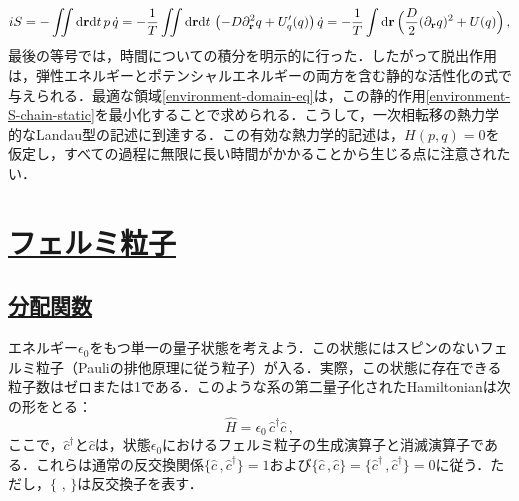 \documentclass[a4paper,11pt]{ltjsarticle}
\newcommand{\sectionlink}[1]{\section[#1]{\hyperlink{toc}{#1}}}
\newcommand{\subsectionlink}[1]{\subsection[#1]{\hyperlink{toc}{#1}}}
\def\d{\mathrm{d}}
\begin{document}
\begin{equation}\label{environment-S-chain-static}
iS=-\iint\d\mathbf{r}\d t\,p\, \dot q
=-{1\over T} \iint\d\mathbf{r}\d t\,
\left(-D \partial^2_\mathbf{r} q + U'_q(q)\right) \dot q
=-{1\over T}\int\d\mathbf{r}\,\Big({D\over 2} (\partial_\mathbf{r}
q)^2 + U(q)\Big)\, ,
\end{equation}最後の等号では，時間についての積分を明示的に行った．したがって脱出作用は，弾性エネルギーとポテンシャルエネルギーの両方を含む静的な活性化の式で与えられる．最適な領域\eqref{environment-domain-eq}は，この静的作用\eqref{environment-S-chain-static}を最小化することで求められる．こうして，一次相転移の熱力学的なLandau型の記述に到達する．この有効な熱力学的記述は，$H(p,q)=0$を仮定し，すべての過程に無限に長い時間がかかることから生じる点に注意されたい．





\sectionlink{フェルミ粒子}\label{sec_fermion}
\subsectionlink{分配関数}\label{sec_fermion-1}



エネルギー$\epsilon_0$をもつ単一の量子状態を考えよう．この状態にはスピンのないフェルミ粒子（Pauliの排他原理に従う粒子）が入る．実際，この状態に存在できる粒子数はゼロまたは1である．このような系の第二量子化されたHamiltonianは次の形をとる：
\begin{equation}\label{fermion-H}
\hat{H}=\epsilon_0\,\hat{c}^\dagger \hat{c}\, ,
\end{equation}
ここで，$\hat{c}^\dagger$と$\hat{c}$は，状態$\epsilon_0$におけるフェルミ粒子の生成演算子と消滅演算子である．これらは通常の反交換関係$\{\hat{c}\,,\hat{c}^\dagger\}=1$および$\{\hat{c}\,,\hat{c}\}=\{\hat{c}^\dagger\,,\hat{c}^\dagger\}=0$に従う．ただし，$\{\,\, ,\,\}$は反交換子を表す．
\end{document}
